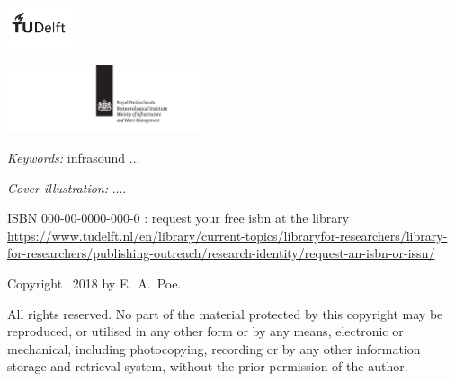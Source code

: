 \begin{titlepage}
\vfill
%
\noindent
\begin{minipage}[b]{0.5\textwidth}
	\begin{center}%
		\includegraphics[height=12mm,clip=true,trim=0 9.8mm 0 3.5mm]{title/logos/tudelft_zw}%
	\end{center}%
	\vspace{-0.95mm}
\end{minipage}
\begin{minipage}[b]{0.5\textwidth}
	\begin{center}%
		\includegraphics[height=20mm,clip=true,trim=40mm 7mm 20mm 0]{title/logos/knmi_zw}%
	\end{center}%
\end{minipage}
%
\vfill

\noindent \textit{Keywords:} infrasound ...

\bigskip
\noindent \textit{Cover illustration:} ....

\bigskip
\bigskip

\noindent ISBN 000-00-0000-000-0 : request your free isbn at the library \url{https://www.tudelft.nl/en/library/current-topics/libraryfor-researchers/library-for-researchers/publishing-outreach/research-identity/request-an-isbn-or-issn/}

\bigskip

\noindent Copyright \textcopyright\ 2018 by E.~A.~Poe.

\medskip
\noindent All rights reserved. No part of the material protected by this copyright may be reproduced, or utilised in any other form or by any means, electronic or mechanical, including photocopying, recording or by any other information storage and retrieval system, without the prior permission of the author.


\end{titlepage}
